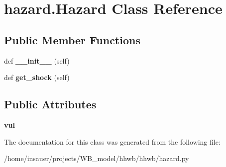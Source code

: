 \hypertarget{classhazard_1_1Hazard}{}\section{hazard.\+Hazard Class Reference}
\label{classhazard_1_1Hazard}
\subsection*{Public Member Functions}
\begin{DoxyCompactItemize}
\item 
\mbox{\label{classhazard_1_1Hazard_a515b0ce93292c6e892c466dbf2210afc}} 
def {\bfseries \+\_\+\+\_\+init\+\_\+\+\_\+} (self)
\item 
\mbox{\label{classhazard_1_1Hazard_a2b521ce06a49a23dce4f9b6cdc7ca7eb}} 
def {\bfseries get\+\_\+shock} (self)
\end{DoxyCompactItemize}
\subsection*{Public Attributes}
\begin{DoxyCompactItemize}
\item 
\mbox{\label{classhazard_1_1Hazard_afef68dee74dd931c86320c5113de268c}} 
{\bfseries vul}
\end{DoxyCompactItemize}


The documentation for this class was generated from the following file\+:\begin{DoxyCompactItemize}
\item 
/home/insauer/projects/\+W\+B\+\_\+model/hhwb/hhwb/hazard.\+py\end{DoxyCompactItemize}
